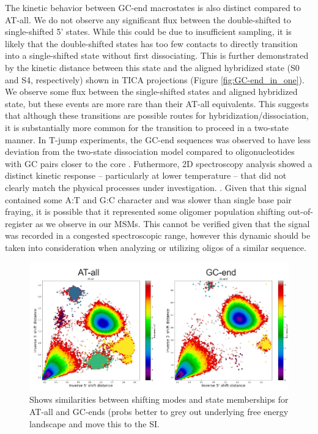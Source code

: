 \documentclass[journal=jpcbfk,manuscript=article]{achemso}
\begin{document}
The kinetic behavior between GC-end macrostates is also distinct compared to AT-all. We do not observe any significant flux between the double-shifted to single-shifted 5' states. While this could be due to insufficient sampling, it is likely that the double-shifted states has too few contacts to directly transition into a single-shifted state without first dissociating. This is further demonstrated by the kinetic distance between this state and the aligned hybridized state (S0 and S4, respectively) shown in TICA projections (Figure \ref{fig:GC-end_in_one}). We observe some flux between the single-shifted states and aligned hybridized state, but these events are more rare than their AT-all equivalents. This suggests that although these transitions are possible routes for hybridization/dissociation, it is substantially more common for the transition to proceed in a two-state manner. In T-jump experiments, the GC-end sequences was observed to have less deviation from the two-state dissociation model compared to oligonucleotides with GC pairs closer to the core \citep{Sanstead2016}. Futhermore, 2D spectroscopy analysis showed a distinct kinetic response -- particularly at lower temperature -- that did not clearly match the physical processes under investigation. \citep{Sanstead2018DirectDehybridization}. Given that this signal contained some A:T and G:C character and was slower than single base pair fraying, it is possible that it represented some oligomer population shifting out-of-register as we observe in our MSMs. This cannot be verified given that the signal was recorded in a congested spectroscopic range, however this dynamic should be taken into consideration when analyzing or utilizing oligos of a similar sequence.


\begin{figure}[ht!]
	\begin{center}
        \includegraphics[width=\textwidth]{Figs/skeleton/shifting_distribution.PNG}
        \caption{Shows similarities between shifting modes and state memberships for AT-all and GC-ends (probs better to grey out underlying free energy landscape and move this to the SI.}
        \label{fig:shifting_distributions}
	\end{center}
\end{figure}
\end{document}
